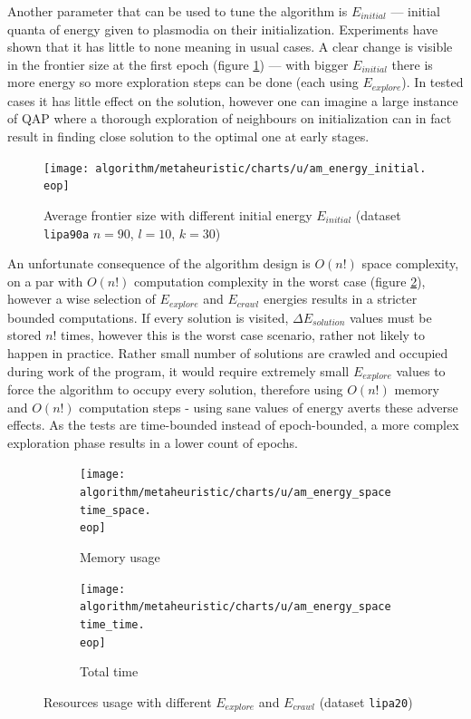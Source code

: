 \documentclass[english,a4paper,twoside]{ppfcmthesis}
\begin{document}
Another parameter that can be used to tune the algorithm is $E_{initial}$ --- initial quanta of energy given to plasmodia on their initialization. Experiments have shown that it has little to none meaning in usual cases. A clear change is visible in the frontier size at the first epoch (figure \ref{figure:am_energy_initial}) --- with bigger $E_{initial}$ there is more energy so more exploration steps can be done (each using $E_{explore}$). In tested cases it has little effect on the solution, however one can imagine a large instance of QAP where a thorough exploration of neighbours on initialization can in fact result in finding close solution to the optimal one at early stages.

\begin{figure}
  \centering

  \texttt{[image: algorithm/metaheuristic/charts/u/am\_energy\_initial.\\eop]}

  \caption{Average frontier size with different initial energy $E_{initial}$ (dataset \texttt{lipa90a} $n=90$, $l=10$, $k=30$)}
  \label{figure:am_energy_initial}
\end{figure}

An unfortunate consequence of the algorithm design is $O(n!)$ space complexity, on a par with $O(n!)$ computation complexity in the worst case (figure \ref{figure:am_energy_spacetime}), however a wise selection of $E_{explore}$ and $E_{crawl}$ energies results in a stricter bounded computations. If every solution is visited, ${\Delta}E_{solution}$ values must be stored $n!$ times, however this is the worst case scenario, rather not likely to happen in practice. Rather small number of solutions are crawled and occupied during work of the program, it would require extremely small $E_{explore}$ values to force the algorithm to occupy every solution, therefore using $O(n!)$ memory and $O(n!)$ computation steps - using sane values of energy averts these adverse effects. As the tests are time-bounded instead of epoch-bounded, a more complex exploration phase results in a lower count of epochs.

\begin{figure}
  \centering

  \begin{subfigure}{\textwidth}
    \texttt{[image: algorithm/metaheuristic/charts/u/am\_energy\_spacetime\_space.\\eop]}
    \caption{Memory usage}
  \end{subfigure}
  \par\bigskip
  \begin{subfigure}{\textwidth}
    \texttt{[image: algorithm/metaheuristic/charts/u/am\_energy\_spacetime\_time.\\eop]}
    \caption{Total time}
  \end{subfigure}

  \caption{Resources usage with different $E_{explore}$ and $E_{crawl}$ (dataset \texttt{lipa20})}
  \label{figure:am_energy_spacetime}
\end{figure}
\end{document}
